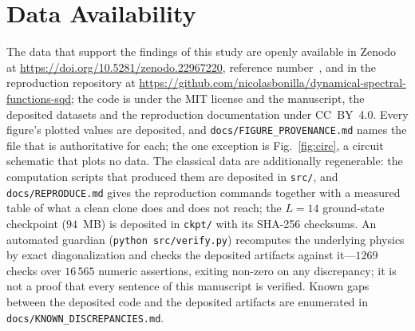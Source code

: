 \section*{Data Availability}
The data that support the findings of this study are openly available in Zenodo at
\url{https://doi.org/10.5281/zenodo.22967220}, reference number~\cite{p2repo}, and in the
reproduction repository at \url{https://github.com/nicolasbonilla/dynamical-spectral-functions-sqd};
the code is under the MIT license and the manuscript, the deposited datasets and the reproduction
documentation under CC~BY~4.0. Every figure's plotted values are deposited, and
\texttt{docs/FIGURE\_PROVENANCE.md} names the file that is authoritative for each; the one exception
is Fig.~\ref{fig:circ}, a circuit schematic that plots no data. The classical data are
additionally regenerable: the computation scripts that produced them are deposited in
\texttt{src/}, and \texttt{docs/REPRODUCE.md} gives the reproduction commands together with a
measured table of what a clean clone does and does not reach; the $L=14$ ground-state checkpoint
($94$~MB) is deposited in \texttt{ckpt/} with its SHA-256 checksums. An automated guardian (\texttt{python src/verify.py}) recomputes the
underlying physics by exact diagonalization and checks the deposited artifacts against
it---$1269$ checks over $16\,565$ numeric assertions, exiting non-zero on any discrepancy; it is
not a proof that every sentence of this manuscript is verified. Known gaps between the deposited
code and the deposited artifacts are enumerated in \texttt{docs/KNOWN\_DISCREPANCIES.md}.
